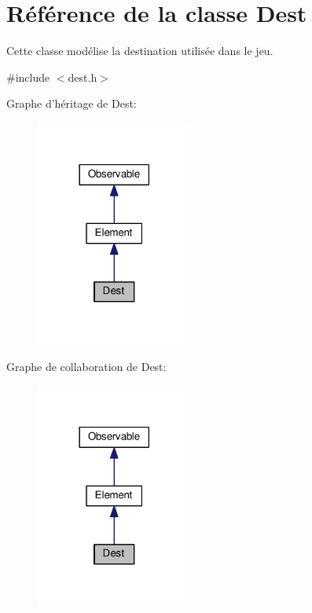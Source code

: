 \hypertarget{classDest}{\section{Référence de la classe Dest}
\label{classDest}
}


Cette classe modélise la destination utilisée dans le jeu.  




{\ttfamily \#include $<$dest.\+h$>$}



Graphe d'héritage de Dest\+:\nopagebreak
\begin{figure}[H]
\begin{center}
\leavevmode
\includegraphics[width=146pt]{d9/d5c/classDest__inherit__graph}
\end{center}
\end{figure}


Graphe de collaboration de Dest\+:\nopagebreak
\begin{figure}[H]
\begin{center}
\leavevmode
\includegraphics[width=146pt]{d4/d77/classDest__coll__graph}
\end{center}
\end{figure}
